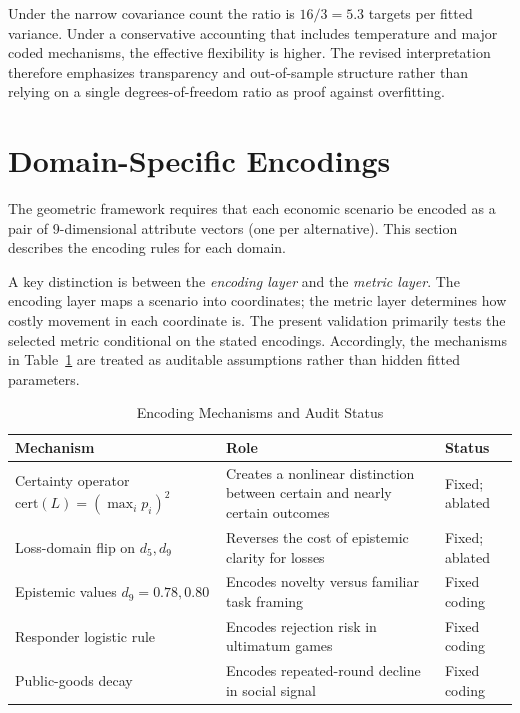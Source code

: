 \documentclass[journal]{IEEEtran}
\begin{document}
Under the narrow covariance count the ratio is $16/3=5.3$ targets per fitted variance.
Under a conservative accounting that includes temperature and major coded mechanisms, the effective flexibility is higher.
The revised interpretation therefore emphasizes transparency and out-of-sample structure rather than relying on a single degrees-of-freedom ratio as proof against overfitting.
\section{Domain-Specific Encodings}
\label{sec:encoding}

The geometric framework requires that each economic scenario be encoded as a pair of 9-dimensional attribute vectors (one per alternative).
This section describes the encoding rules for each domain.


A key distinction is between the \emph{encoding layer} and the \emph{metric layer}.
The encoding layer maps a scenario into coordinates; the metric layer determines how costly movement in each coordinate is.
The present validation primarily tests the selected metric conditional on the stated encodings.
Accordingly, the mechanisms in Table~\ref{tab:encoding_audit} are treated as auditable assumptions rather than hidden fitted parameters.

\begin{table}[!t]
\renewcommand{\arraystretch}{1.12}
\caption{Encoding Mechanisms and Audit Status}
\label{tab:encoding_audit}
\centering
\begin{tabular}{@{}p{} p{} p{}@{}}
\toprule
\textbf{Mechanism} & \textbf{Role} & \textbf{Status} \\
\midrule
Certainty operator $\text{cert}(L)=(\max_i p_i)^2$ & Creates a nonlinear distinction between certain and nearly certain outcomes & Fixed; ablated \\
Loss-domain flip on $d_5,d_9$ & Reverses the cost of epistemic clarity for losses & Fixed; ablated \\
Epistemic values $d_9=0.78,0.80$ & Encodes novelty versus familiar task framing & Fixed coding \\
Responder logistic rule & Encodes rejection risk in ultimatum games & Fixed coding \\
Public-goods decay & Encodes repeated-round decline in social signal & Fixed coding \\
\bottomrule
\end{tabular}
\end{table}
\end{document}
